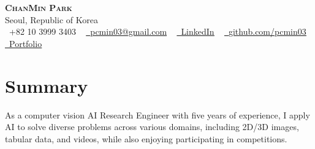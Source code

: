 \documentclass[letterpaper,10pt]{article}
\begin{document}

\begin{center}
    {\scshape \Large\textbf{ChanMin Park}} \\ \vspace{1pt}
    Seoul, Republic of Korea \\ \vspace{1pt}
    \small \raisebox{-0.1\height}\faPhone\ +82 10 3999 3403 ~ \href{mailto:pcmin03@gmail.com}{\raisebox{-0.2\height}\faEnvelope\  \underline{pcmin03@gmail.com}} ~ 
    \href{https://www.linkedin.com/in/chan-min-park-0abab713b/}{\raisebox{-0.2\height}\faLinkedin\ \underline{LinkedIn}}  ~
    \href{https://github.com/pcmin03}{\raisebox{-0.2\height}\faGithub\ \underline{github.com/pcmin03}} ~
    \href{https://smoggy-fibula-4b3.notion.site/My-Portfolio-Chan-Min-Park-195c3ffbc67f4f67a80eca8b9a506a3b?pvs=4}{\raisebox{-0.2\height}\faHome\ \underline{Portfolio}}
    \vspace{-8pt}
\end{center}

\section{Summary}
 \begin{itemize}[leftmargin=0.15in, label={}]
    \small{\item{As a computer vision AI Research Engineer with five years of experience, I apply AI to solve diverse problems across various domains, including 2D/3D images, tabular data, and videos, while also enjoying participating in competitions.
    }}
 \end{itemize}
 \vspace{-10pt}
\end{document}
